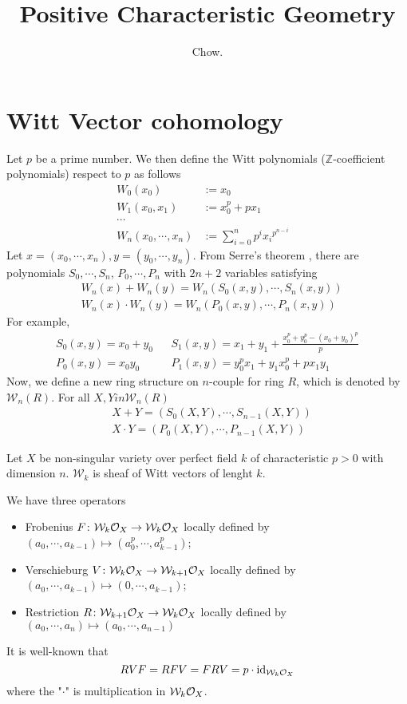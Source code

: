 \documentclass[11pt,a4paper]{scmsnotes}
\title{Positive Characteristic Geometry}
\author{Chow.}
\begin{document}
\maketitle
%
\section{Witt Vector cohomology}
Let $p$ be a prime number. We then define the Witt polynomials ($\mathbb{Z}$-coefficient polynomials) respect to $p$ as follows
\[
\begin{aligned}
	W_0(x_0)&:= x_0 &\\
	W_1(x_0,x_1)&:= x_0^p + p x_1&\\
	\cdots&\\
	W_n(x_0, \cdots, x_n)&:= \sum_{i=0}^{n}p^i{x_i}^{p^{n-i}}
\end{aligned}
\]
Let $x=(x_0, \cdots, x_n), y= (y_0, \cdots, y_n)$. From Serre's theorem \cite{}, there are polynomials $S_0, \cdots, S_n$, $P_0, \cdots, P_n$ with $2n+2$ variables satisfying 
\[
\begin{aligned}
&W_n(x) + W_n(y) = W_n (S_0(x,y), \cdots, S_n(x,y))\\
&W_n(x) \cdot W_n(y)= W_n(P_0(x,y), \cdots, P_n(x,y))
\end{aligned}
\]
For example, 
\[
\begin{aligned}
&S_0(x,y)=x_0 + y_0 & & S_1(x,y)=x_1 + y_1 + \frac{x_0^p+y_0^p - (x_0 +y_0)^p}{p}&\\
&P_0(x,y)=x_0 y_0 & & P_1(x,y)= y_0^p x_1+ y_1 x_0^p + px_1 y_1
\end{aligned}
\]
Now, we define a new ring structure on $n$-couple for ring $R$, which is denoted by $\mathcal{W}_n(R)$. For all $X,Y in \mathcal{W}_n(R)$
\[
\begin{aligned}
&X + Y= (S_0(X,Y),\cdots, S_{n-1}(X,Y))\\
&X \cdot Y= (P_0(X,Y),\cdots, P_{n-1}(X,Y))
\end{aligned}
\]

Let $X$ be non-singular variety over perfect field $k$ of characteristic $p > 0$ with dimension $n$. $\mathcal{W}_k$ is sheaf of Witt vectors of lenght $k$.

We have three operators
\begin{itemize}
\item Frobenius $F \colon \mathcal{W}_k \mathcal{O}_{X} \to \mathcal{W}_k \mathcal{O}_{X}$ locally defined by $(a_0, \cdots , a_{k-1}) \mapsto (a^p_0, \cdots, a^p_{k-1})$;
\item Verschieburg $V \colon \mathcal{W}_k \mathcal{O}_{X} \to \mathcal{W}_{k+1} \mathcal{O}_{X}$ locally defined by $(a_0, \cdots, a_{k-1}) \mapsto (0, \cdots, a_{k-1})$;
\item Restriction $R \colon \mathcal{W}_{k+1}\mathcal{O}_{X} \to \mathcal{W}_k \mathcal{O}_{X}$ locally defined by $(a_0, \cdots, a_n) \mapsto (a_0, \cdots, a_{n-1})$
\end{itemize}
It is well-known that 
\[
RVF= RFV =FRV = p \cdot \text{id}_{\mathcal{W}_k \mathcal{O}_{X}}
\]
where the "$\cdot$" is multiplication in $\mathcal{W}_k \mathcal{O}_{X}$.
\end{document}
